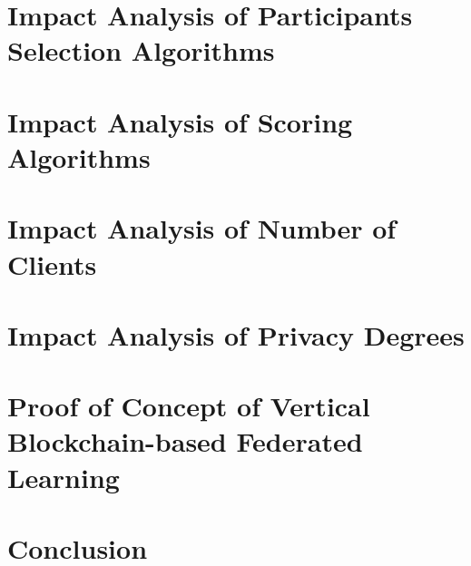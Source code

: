 \documentclass[12pt,a4paper,oneside]{book}
\begin{document}
\chapter{Impact Analysis of Participants Selection Algorithms}\label{chapter:analysis:participants}


\chapter{Impact Analysis of Scoring Algorithms}\label{chapter:analysis:scoring}


\chapter{Impact Analysis of Number of Clients}\label{chapter:analysis:clients}


\chapter{Impact Analysis of Privacy Degrees}\label{chapter:analysis:privacy}


\chapter{Proof of Concept of Vertical Blockchain-based Federated Learning}\label{chapter:vertical}


\chapter{Conclusion}\label{chapter:conclusion}






\end{document}
